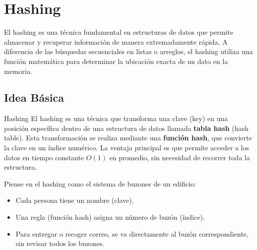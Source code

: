 \chapter{Hashing}
\label{ch:hashing}

El hashing es una técnica fundamental en estructuras de datos que permite almacenar y recuperar información de manera extremadamente rápida. A diferencia de las búsquedas secuenciales en listas o arreglos, el hashing utiliza una función matemática para determinar la ubicación exacta de un dato en la memoria.

\section{Idea Básica}
\label{sec:idea-basica}

\begin{definicion}{Hashing}
El hashing es una técnica que transforma una clave (key) en una posición específica dentro de una estructura de datos llamada \textbf{tabla hash} (hash table). Esta transformación se realiza mediante una \textbf{función hash}, que convierte la clave en un índice numérico. La ventaja principal es que permite acceder a los datos en tiempo constante \( O(1) \) en promedio, sin necesidad de recorrer toda la estructura.
\end{definicion}

\begin{observacion}
Piense en el hashing como el sistema de buzones de un edificio:
\begin{itemize}
    \item Cada persona tiene un nombre (clave).
    \item Una regla (función hash) asigna un número de buzón (índice).
    \item Para entregar o recoger correo, se va directamente al buzón correspondiente, sin revisar todos los buzones.
\end{itemize}
\end{observacion}

